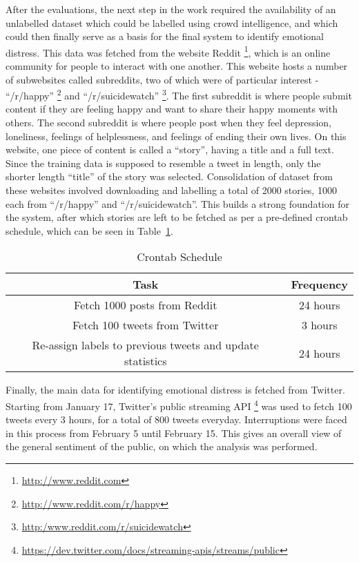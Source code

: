 After the evaluations, the next step in the work required the availability of an unlabelled dataset which could be labelled using crowd intelligence, and which could then finally serve as a basis for the final system to identify emotional distress. This data was fetched from the website Reddit \footnote{\url{http://www.reddit.com}}, which is an online community for people to interact with one another. This website hosts a number of subwebsites called subreddits, two of which were of particular interest - ``/r/happy'' \footnote{\url{http://www.reddit.com/r/happy}} and ``/r/suicidewatch'' \footnote{\url{http:/www.reddit.com/r/suicidewatch}}. The first subreddit is where people submit content if they are feeling happy and want to share their happy moments with others. The second subreddit is where people post when they feel depression, loneliness, feelings of helplessness, and feelings of ending their own lives. On this website, one piece of content is called a ``story'', having a title and a full text. Since the training data is supposed to resemble a tweet in length, only the shorter length ``title'' of the story was selected. Consolidation of dataset from these websites involved downloading and labelling a total of 2000 stories, 1000 each from ``/r/happy'' and ``/r/suicidewatch''. This builds a strong foundation for the system, after which stories are left to be fetched as per a pre-defined crontab schedule, which can be seen in Table~\ref{tab:cron_schedule}.\\

\begin{table}
    \begin{center}
        \begin{tabular}{ | c | c | }
            \hline
            \textbf{Task} & \textbf{Frequency} \\
            \hline
            Fetch 1000 posts from Reddit & 24 hours \\
            \hline
            Fetch 100 tweets from Twitter & 3 hours \\
            \hline
            Re-assign labels to previous tweets and update statistics & 24 hours \\
            \hline
        \end{tabular}
    \end{center}
    \caption{Crontab Schedule}
    \label{tab:cron_schedule}
\end{table}

Finally, the main data for identifying emotional distress is fetched from Twitter. Starting from January 17, Twitter's public streaming API \footnote{\url{https://dev.twitter.com/docs/streaming-apis/streams/public}} was used to fetch 100 tweets every 3 hours, for a total of 800 tweets everyday. Interruptions were faced in this process from February 5 until February 15. This gives an overall view of the general sentiment of the public, on which the analysis was performed.


